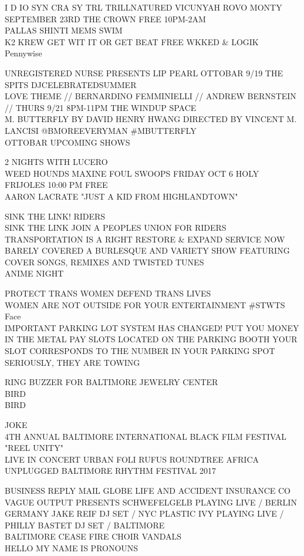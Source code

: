 \documentclass[10pt,letterpaper]{article}
\begin{document}
I D IO SYN CRA SY TRL TRILLNATURED VICUNYAH ROVO MONTY SEPTEMBER 23RD THE CROWN FREE 10PM{-}2AM\\
PALLAS SHINTI MEMS SWIM\\
K2 KREW GET WIT IT OR GET BEAT FREE WKKED \& LOGIK\\
Pennywise

UNREGISTERED NURSE PRESENTS LIP PEARL OTTOBAR 9/19 THE SPITS DJCELEBRATEDSUMMER\\
LOVE THEME // BERNARDINO FEMMINIELLI // ANDREW BERNSTEIN // THURS 9/21 8PM{-}11PM THE WINDUP SPACE\\
M. BUTTERFLY BY DAVID HENRY HWANG DIRECTED BY VINCENT M. LANCISI @BMOREEVERYMAN \#MBUTTERFLY\\
OTTOBAR UPCOMING SHOWS

2 NIGHTS WITH LUCERO\\
WEED HOUNDS MAXINE FOUL SWOOPS FRIDAY OCT 6 HOLY FRIJOLES 10:00 PM FREE\\
AARON LACRATE "JUST A KID FROM HIGHLANDTOWN"

SINK THE LINK!  RIDERS\\
SINK THE LINK JOIN A PEOPLES UNION FOR RIDERS TRANSPORTATION IS A RIGHT RESTORE \& EXPAND SERVICE NOW\\
BARELY COVERED A BURLESQUE AND VARIETY SHOW FEATURING COVER SONGS, REMIXES AND TWISTED TUNES\\
ANIME NIGHT

PROTECT TRANS WOMEN DEFEND TRANS LIVES\\
WOMEN ARE NOT OUTSIDE FOR YOUR ENTERTAINMENT \#STWTS\\
Face\\
IMPORTANT PARKING LOT SYSTEM HAS CHANGED!  PUT YOU MONEY IN THE METAL PAY SLOTS LOCATED ON THE PARKING BOOTH YOUR SLOT CORRESPONDS TO THE NUMBER IN YOUR PARKING SPOT SERIOUSLY, THEY ARE TOWING

RING BUZZER FOR BALTIMORE JEWELRY CENTER\\
BIRD\\
BIRD

JOKE\\
4TH ANNUAL BALTIMORE INTERNATIONAL BLACK FILM FESTIVAL "REEL UNITY"\\
LIVE IN CONCERT URBAN FOLI RUFUS ROUNDTREE AFRICA UNPLUGGED BALTIMORE RHYTHM FESTIVAL 2017

BUSINESS REPLY MAIL GLOBE LIFE AND ACCIDENT INSURANCE CO\\
VAGUE OUTPUT PRESENTS SCHWEFELGELB  PLAYING LIVE / BERLIN GERMANY JAKE REIF DJ SET / NYC PLASTIC IVY PLAYING LIVE / PHILLY BASTET DJ SET / BALTIMORE\\
BALTIMORE CEASE FIRE CHOIR VANDALS\\
HELLO MY NAME IS PRONOUNS
\end{document}

